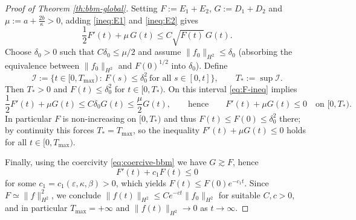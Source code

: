 \documentclass[10pt,a4paper]{amsart}
\begin{document}
\begin{proof}[Proof of Theorem \ref{th:bbm-global}]
	Setting $F:=E_1+E_2$, $G:=D_1+D_2$ and $\mu:=a+\frac{2b}{\kappa}>0$, adding \eqref{ineq:E1} and \eqref{ineq:E2} gives
	\begin{equation}\label{eq:F-ineq}
		\frac12 F'(t)+\mu\,G(t)\le C\sqrt{F(t)}\,G(t).
	\end{equation}
	Choose $\delta_0>0$ such that $C\delta_0\le \mu/2$ and assume $\|f_0\|_{H^2}\le\delta_0$ (absorbing the equivalence between
	$\|f_0\|_{H^2}$ and $F(0)^{1/2}$ into $\delta_0$). Define
	\[
	\mathcal{I}:=\Big\{t\in[0,T_{\max})\,:\,F(s)\le \delta_0^2\ \text{for all }s\in[0,t]\Big\},\qquad
	T_*:=\sup\mathcal{I}.
	\]
	Then $T_*>0$ and $F(t)\le \delta_0^2$ for $t\in[0,T_*)$. On this interval \eqref{eq:F-ineq} implies
	\[
	\frac12 F'(t)+\mu G(t)\le C\delta_0 G(t)\le \frac{\mu}{2}G(t),
	\qquad\text{hence}\qquad
	F'(t)+\mu G(t)\le 0 \quad \text{on }[0,T_*).
	\]
	In particular $F$ is non-increasing on $[0,T_*)$ and thus $F(t)\le F(0)\le \delta_0^2$ there; by continuity this forces
	$T_*=T_{\max}$, so the inequality $F'(t)+\mu G(t)\le 0$ holds for all $t\in[0,T_{\max})$.
	
	Finally, using the coercivity \eqref{eq:coercive-bbm} we have $G\gtrsim F$, hence
	\[
	F'(t)+c_1 F(t)\le 0
	\]
	for some $c_1=c_1(\varepsilon,\kappa,\beta)>0$, which yields $F(t)\le F(0)e^{-c_1 t}$. Since $F\simeq \|f\|_{H^2}^2$,
	we conclude $\|f(t)\|_{H^2}\le C e^{-ct}\|f_0\|_{H^2}$ for suitable $C,c>0$, and in particular $T_{\max}=+\infty$ and
	$\|f(t)\|_{H^2}\to 0$ as $t\to\infty$.
\end{proof}
\end{document}
